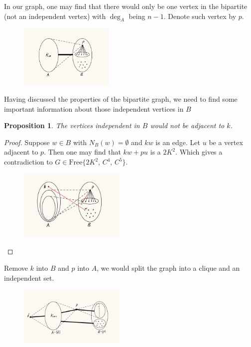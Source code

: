 \documentclass{article}
\newtheorem{prop}{\bf Proposition}
\begin{document}
    In our graph, one may find that there would only be one vertex in the bipartite (not an independent vertex) with $\deg_A$ being $n-1$. Denote such vertex by $p$.

    \begin{figure}[h!]%
        \centering
        \includegraphics[width=0.4\textwidth]{pic/g8.jpg}
    \end{figure}
    
    Having discussed the properties of the bipartite graph, we need to find some important information about those independent vertices in $B$
\newpage
    \begin{prop}
        The vertices independent in $B$ would not be adjacent to $k$.
    \end{prop}

    \begin{proof}
        Suppose $w\in B$ with $N_B(w)=\emptyset$ and $kw$ is an edge. Let $u$ be a vertex adjacent to $p$. Then one may find that $kw+pu$ is a $2K^2$. Which gives a contradiction to $G\in\text{Free}\{2K^2,\,C^4,\,C^5\}$.
        \begin{figure}[h!]%
        \centering
        \includegraphics[width=0.45\textwidth]{pic/g9.jpg}
    \end{figure}
    \end{proof}

    Remove $k$ into $B$ and $p$ into $A$, we would split the graph into a clique and an independent set.
    \begin{figure}[h!]%
        \centering
        \includegraphics[width=0.45\textwidth]{pic/g10.jpg}
    \end{figure}
\end{document}
